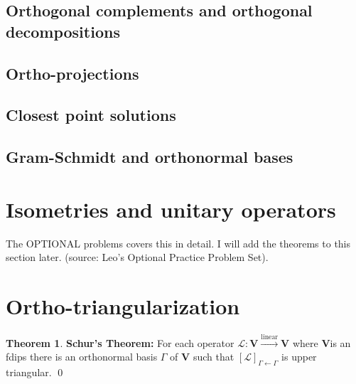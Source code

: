 \documentclass{article}
\theoremstyle{definition}
\newtheorem{thm}{Theorem}[section]
\newcommand{\V}{\mathbf{V}}
\newcommand{\lag}{\mathcal{L}}
\newcommand{\lin}{\overset{\text{linear}}{\longrightarrow}}
\begin{document}
\subsection{Orthogonal complements and orthogonal decompositions}



\subsection{Ortho-projections}



\subsection{Closest point solutions}





\subsection{Gram-Schmidt and orthonormal bases}

\newpage

\section{Isometries and unitary operators}

The OPTIONAL problems covers this in detail. I will add the theorems to this section later. (source: Leo's Optional Practice Problem Set).

\newpage 

\section{Ortho-triangularization}

\begin{thm}\textbf{Schur's Theorem:} 
	For each operator $\lag : \V \lin \V$ where $\V$is an fdips there is an orthonormal basis $\Gamma$ of $\V$ such that $[\lag]_{\Gamma\leftarrow\Gamma}$ is upper triangular. \qed
\end{thm}
\end{document}
